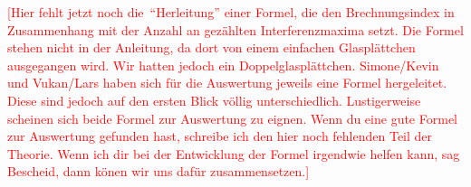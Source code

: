 \textcolor{red}{[Hier fehlt jetzt noch die~\enquote{Herleitung} einer Formel,
die den Brechnungsindex in Zusammenhang mit der Anzahl an gezählten
Interferenzmaxima setzt. Die Formel stehen nicht in der Anleitung, da dort von
einem einfachen Glasplättchen ausgegangen wird. Wir hatten jedoch ein
Doppelglasplättchen. Simone/Kevin und Vukan/Lars haben sich für die Auswertung
jeweils eine Formel hergeleitet. Diese sind jedoch auf den ersten Blick völlig
unterschiedlich. Lustigerweise scheinen sich beide Formel zur Auswertung zu
eignen. Wenn du eine gute Formel zur Auswertung gefunden hast, schreibe ich den
hier noch fehlenden Teil der Theorie. Wenn ich dir bei der Entwicklung der
Formel irgendwie helfen kann, sag Bescheid, dann könen wir uns dafür
zusammensetzen.]}
